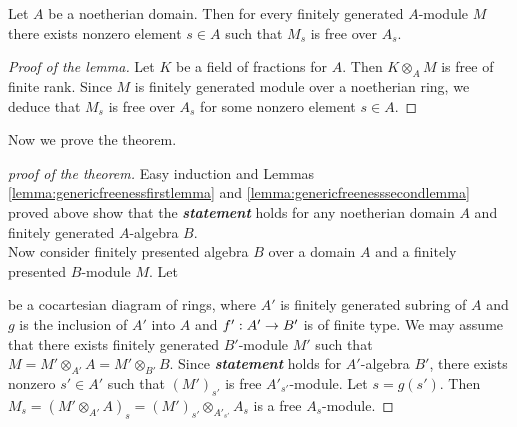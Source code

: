 \begin{lemma}\label{lemma:genericfreenesssecondlemma}
Let $A$ be a noetherian domain. Then for every finitely generated $A$-module $M$ there exists nonzero element $s\in A$ such that $M_s$ is free over $A_s$.
\end{lemma}
\begin{proof}[Proof of the lemma]
Let $K$ be a field of fractions for $A$. Then $K\otimes_AM$ is free of finite rank. Since $M$ is finitely generated module over a noetherian ring, we deduce that $M_s$ is free over $A_s$ for some nonzero element $s\in A$.
\end{proof}
\noindent
Now we prove the theorem.
\begin{proof}[proof of the theorem]
Easy induction and Lemmas \ref{lemma:genericfreenessfirstlemma} and \ref{lemma:genericfreenesssecondlemma} proved above show that the \textit{\textbf{statement}} holds for any noetherian domain $A$ and finitely generated $A$-algebra $B$.\\
Now consider finitely presented algebra $B$ over a domain $A$ and a finitely presented $B$-module $M$. Let
\begin{center}
\end{center}
be a cocartesian diagram of rings, where $A'$ is finitely generated subring of $A$ and $g$ is the inclusion of $A'$ into $A$ and $f':A'\rightarrow B'$ is of finite type. We may assume that there exists finitely generated $B'$-module $M'$ such that $M=M'\otimes_{A'}A=M'\otimes_{B'}B$. Since \textit{\textbf{statement}} holds for $A'$-algebra $B'$, there exists nonzero $s'\in A'$ such that $(M')_{s'}$ is free ${A'}_{s'}$-module. Let $s=g(s')$. Then $M_s=(M'\otimes_{A'}A)_s=(M')_{s'}\otimes_{A'_{s'}}A_s$ is a free $A_s$-module.
\end{proof}
